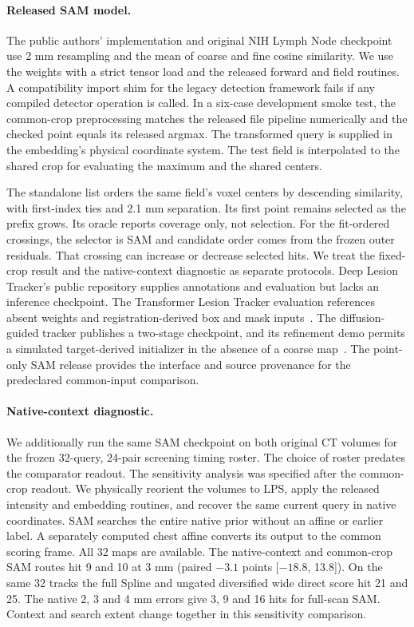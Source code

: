 \paragraph{Released SAM model.}
The public authors' implementation and original NIH Lymph Node checkpoint~\cite{yan2022sam} use 2 mm resampling and the mean of coarse and fine cosine similarity. We use the weights with a strict tensor load and the released forward and field routines. A compatibility import shim for the legacy detection framework fails if any compiled detector operation is called. In a six-case development smoke test, the common-crop preprocessing matches the released file pipeline numerically and the checked point equals its released argmax. The transformed query is supplied in the embedding's physical coordinate system. The test field is interpolated to the shared crop for evaluating the maximum and the shared centers.

The standalone list orders the same field's voxel centers by descending similarity, with first-index ties and 2.1 mm separation. Its first point remains selected as the prefix grows. Its oracle reports coverage only, not selection. For the fit-ordered crossings, the selector is SAM and candidate order comes from the frozen outer residuals. That crossing can increase or decrease selected hits. We treat the fixed-crop result and the native-context diagnostic as separate protocols. Deep Lesion Tracker's public repository supplies annotations and evaluation but lacks an inference checkpoint. The Transformer Lesion Tracker evaluation references absent weights and registration-derived box and mask inputs~\cite{cai2021,tang2022tlt}. The diffusion-guided tracker publishes a two-stage checkpoint, and its refinement demo permits a simulated target-derived initializer in the absence of a coarse map~\cite{zhuang2026diffusion}. The point-only SAM release provides the interface and source provenance for the predeclared common-input comparison.

\paragraph{Native-context diagnostic.}
We additionally run the same SAM checkpoint on both original CT volumes for the frozen 32-query, 24-pair screening timing roster. The choice of roster predates the comparator readout. The sensitivity analysis was specified after the common-crop readout. We physically reorient the volumes to LPS, apply the released intensity and embedding routines, and recover the same current query in native coordinates. SAM searches the entire native prior without an affine or earlier label. A separately computed chest affine converts its output to the common scoring frame. All 32 maps are available. The native-context and common-crop SAM routes hit 9 and 10 at 3 mm (paired $-3.1$ points [$-18.8$, 13.8]). On the same 32 tracks the full Spline and ungated diversified wide direct score hit 21 and 25. The native 2, 3 and 4 mm errors give 3, 9 and 16 hits for full-scan SAM. Context and search extent change together in this sensitivity comparison.

